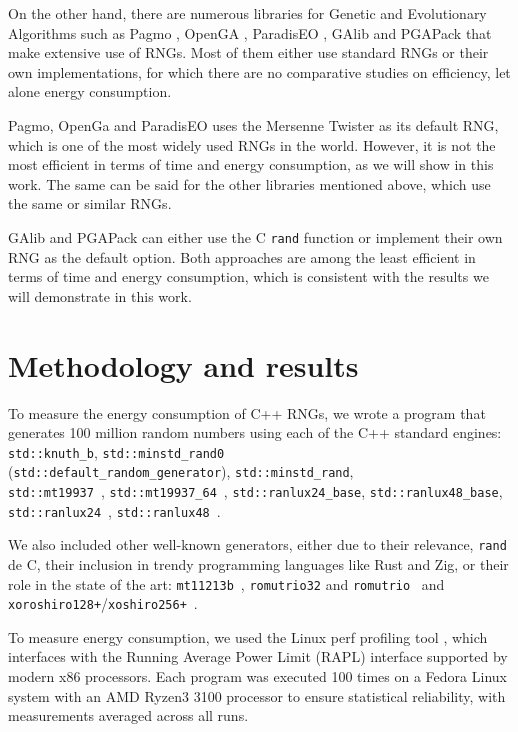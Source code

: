 \documentclass[dvipsnames,format=sigconf]{acmart}
\begin{document}
On the other hand, there are numerous libraries for Genetic and Evolutionary Algorithms such as Pagmo \cite{Biscani2020}, OpenGA \cite{8122921}, ParadisEO \cite{Dreo-al_2021_Paradiseo}, GAlib \cite{wall1996galib} and PGAPack \cite{levine1996users} that make extensive use of RNGs. Most of them either use standard RNGs or their own implementations, for which there are no comparative studies on efficiency, let alone energy consumption.

Pagmo, OpenGa and ParadisEO uses the Mersenne Twister \cite{mersennetwister} as its default RNG, which is one of the most widely used RNGs in the world. However, it is not the most efficient in terms of time and energy consumption, as we will show in this work. The same can be said for the other libraries mentioned above, which use the same or similar RNGs.

GAlib and PGAPack can either use the C \texttt{rand} function or implement their own RNG as the default option. Both approaches are among the least efficient in terms of time and energy consumption, which is consistent with the results we will demonstrate in this work.

\section{Methodology and results}
\label{sec:methodology}

To measure the energy consumption of C++ RNGs, we wrote a program that generates 100 million random numbers using each of the C++ standard engines: \texttt{std::knuth\_b},  \texttt{std::minstd\_rand0} \\(\texttt{std::default\_random\_generator}),  \texttt{std::minstd\_rand}, \\ \texttt{std::mt19937}~\cite{mersennetwister},  \texttt{std::mt19937\_64}~\cite{mersennetwister}, \texttt{std::ranlux24\_base}, \texttt{std::ranlux48\_base},  \texttt{std::ranlux24}~\cite{JAMES1994111}, \texttt{std::ranlux48}~\cite{JAMES1994111}.

We also included other well-known generators, either due to their relevance, \texttt{rand} de C, their inclusion in trendy programming languages like Rust and Zig, or their role in the state of the art: \texttt{mt11213b}~\cite{mersennetwister}, \texttt{romutrio32} and \texttt{romutrio}~\cite{overton2020romufastnonlinearpseudorandom} and \texttt{xoroshiro128+}/\-\texttt{xoshiro256+}~\cite{blackman2021scrambled}.

To measure energy consumption, we used the Linux perf profiling tool \cite{perf}, which interfaces with the Running Average Power Limit (RAPL) interface \cite{rapl} supported by modern x86 processors. Each program was executed 100 times on a Fedora Linux system with an AMD Ryzen3 3100 processor to ensure statistical reliability, with measurements averaged across all runs.
\end{document}

